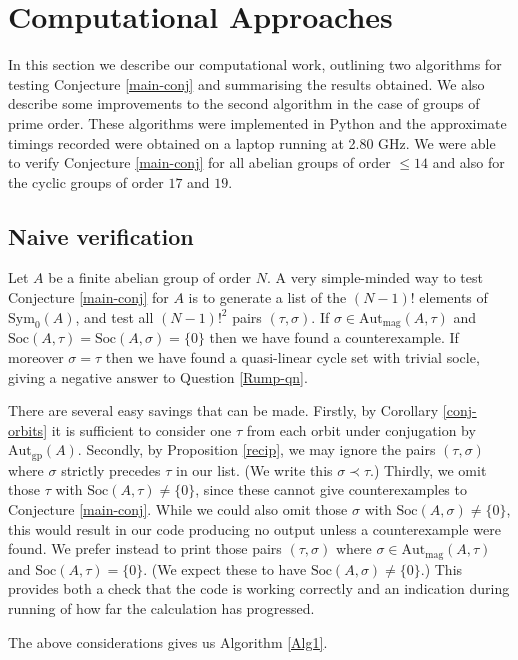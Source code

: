 \documentclass[letterpaper,12pt]{amsart}
\numberwithin{equation}{section}
\numberwithin{algorithm}{section}
\theoremstyle{definition}
\newcommand{\Soc}{\mathrm{Soc}}
\newcommand{\Autgp}{\mathrm{Aut}_{\mathrm{gp}}}
\newcommand{\Autmag}{\mathrm{Aut}_\mathrm{mag}}
\newcommand{\Symo}{\mathrm{Sym}_0}
\begin{document}
\section{Computational Approaches}

In this section we describe our computational work, outlining two algorithms for testing Conjecture \ref{main-conj} and summarising the results obtained. We also describe some improvements to the second algorithm in the case of groups of prime order. These algorithms were implemented in Python and the approximate timings recorded were obtained on a laptop running at 2.80 GHz. We were able to verify Conjecture \ref{main-conj} for all abelian groups of order $\leq 14$ and also for the cyclic groups of order $17$ and $19$.

\subsection{Naive verification}

Let $A$ be a finite abelian group of order $N$. A very simple-minded way to test Conjecture \ref{main-conj} for $A$ is to generate a list of the $(N-1)!$ elements of $\Symo(A)$, and test all $(N-1)!^2$ pairs $(\tau,\sigma)$. If $\sigma \in \Autmag(A,\tau)$ and $\Soc(A,\tau)=\Soc(A,\sigma)=\{0\}$ then we have found a counterexample. If moreover $\sigma=\tau$ then we have found a quasi-linear cycle set with trivial socle, giving a negative answer to Question \ref{Rump-qn}.

There are several easy savings that can be made. Firstly, by Corollary \ref{conj-orbits} it is sufficient to consider one $\tau$ from each orbit under conjugation by $\Autgp(A)$. Secondly, by Proposition \ref{recip}, we may ignore the pairs $(\tau,\sigma)$ where $\sigma$ strictly precedes $\tau$ in our list. (We write this $\sigma \prec \tau$.) Thirdly, we omit those $\tau$ with  $\Soc(A,\tau) \neq \{0\}$, since these cannot give counterexamples to Conjecture \ref{main-conj}. While we could also omit those $\sigma$ with $\Soc(A,\sigma) \neq \{0\}$, this would result in our code producing no output unless a counterexample were found.  We prefer instead to print those pairs $(\tau,\sigma)$ where $\sigma \in \Autmag(A,\tau)$ and $\Soc(A,\tau)=\{0\}$. (We expect these to have $\Soc(A,\sigma) \neq \{0\}$.) This provides both a check that the code is working correctly and an indication during running of how far the calculation has progressed. 

The above considerations gives us Algorithm \ref{Alg1}.
\end{document}
